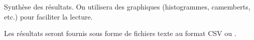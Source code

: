 Synthèse des résultats. On utilisera des graphiques (histogrammes, camemberts, etc.) pour faciliter la lecture.

Les résultats seront fournis sous forme de fichiers texte au format CSV ou . 